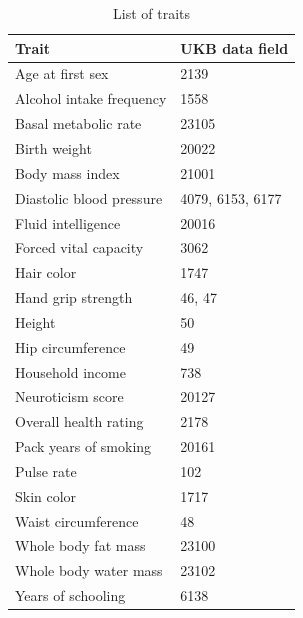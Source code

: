 \documentclass[hidelinks, 12pt]{article}
\begin{document}
\begin{table}[h!]
\caption{List of traits}
\begin{center}
 \begin{tabular}{| l l |} 
 \hline
 \textbf{Trait} & \textbf{UKB data field} \\ [0.5ex] 
 \hline\hline
  Age at first sex & 2139  \\ 
  Alcohol intake frequency & 1558  \\
  Basal metabolic rate & 23105  \\ 
  Birth weight & 20022  \\ 
  Body mass index & 21001  \\
  Diastolic blood pressure & 4079, 6153, 6177  \\ 
  Fluid intelligence & 20016  \\ 
  Forced vital capacity & 3062  \\ 
  Hair color & 1747  \\ 
  Hand grip strength & 46, 47  \\ 
  Height & 50  \\ 
  Hip circumference & 49  \\ 
  Household income & 738  \\ 
  Neuroticism score & 20127  \\ 
  Overall health rating & 2178  \\ 
  Pack years of smoking & 20161  \\ 
  Pulse rate & 102  \\ 
  Skin color & 1717  \\ 
  Waist circumference & 48  \\ 
  Whole body fat mass & 23100  \\ 
  Whole body water mass & 23102  \\ 
  Years of schooling & 6138 \\ 
   \hline
 \end{tabular}
\end{center}
\end{table}
\end{document}
